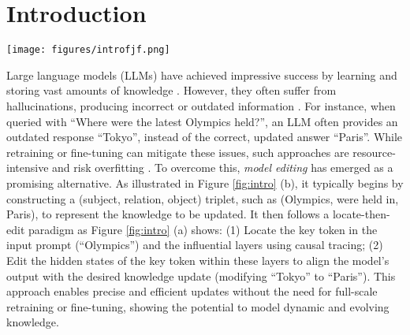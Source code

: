 \section{Introduction}

\begin{figure*}[t]
    \centering
    \texttt{[image: figures/introfjf.png]}
    \vspace{-10pt}
    \caption{Comparison of current methods and our AnyEdit. (a) and (d) illustrate the editing processes; (c) and (e) show the editing efficacy as the number of tokens within the to-be-updated knowledge increases; (b) and (f) depict the type of knowledge that each method can edit. Best viewed in color.}
    \label{fig:intro}
\end{figure*}


Large language models (LLMs) have achieved impressive success by learning and storing vast amounts of knowledge \cite{GPT3, gpt2-xl,survey-llm}. However, they often suffer from hallucinations, producing incorrect or outdated information \cite{KE,MEND}. For instance, when queried with ``Where were the latest Olympics held?'', an LLM often provides an outdated response ``Tokyo'',  instead of the correct, updated answer ``Paris''. While retraining or fine-tuning can mitigate these issues, such approaches are resource-intensive and risk overfitting \cite{SERAC,ROME}. To overcome this, \textit{model editing} has emerged as a promising alternative. As illustrated in Figure \ref{fig:intro} (b), it typically begins by constructing a (subject, relation, object) triplet, such as (Olympics, were held in, Paris), to represent the knowledge to be updated. It then follows a locate-then-edit paradigm as Figure \ref{fig:intro} 
 (a) shows: (1) Locate the key token in the input prompt (\eg ``Olympics'') and the influential layers using causal tracing; (2) Edit the hidden states of the key token within these layers to align the model's output with the desired knowledge update (\eg modifying ``Tokyo'' to ``Paris''). This approach enables precise and efficient updates without the need for full-scale retraining or fine-tuning, showing the potential to model dynamic and evolving knowledge.

